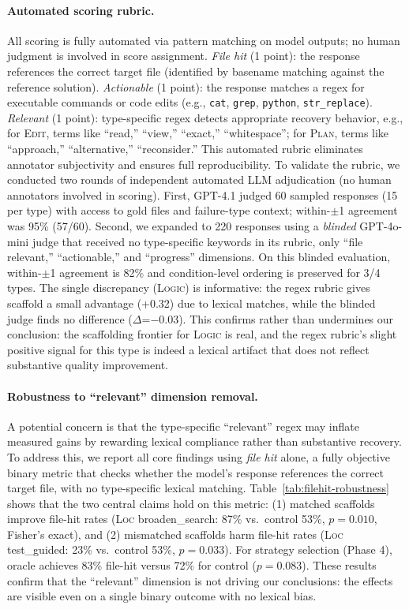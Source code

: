 \documentclass[11pt]{article}
\begin{document}
\paragraph{Automated scoring rubric.}
All scoring is fully automated via pattern matching on model outputs; no human judgment is involved in score assignment.
\textit{File hit} (1 point): the response references the correct target file (identified by basename matching against the reference solution).
\textit{Actionable} (1 point): the response matches a regex for executable commands or code edits (e.g., \texttt{cat}, \texttt{grep}, \texttt{python}, \texttt{str\_replace}).
\textit{Relevant} (1 point): type-specific regex detects appropriate recovery behavior, e.g., for \textsc{Edit}, terms like ``read,'' ``view,'' ``exact,'' ``whitespace''; for \textsc{Plan}, terms like ``approach,'' ``alternative,'' ``reconsider.''
This automated rubric eliminates annotator subjectivity and ensures full reproducibility.
To validate the rubric, we conducted two rounds of independent automated LLM adjudication (no human annotators involved in scoring).
First, GPT-4.1 judged 60 sampled responses (15 per type) with access to gold files and failure-type context; within-$\pm$1 agreement was 95\% (57/60).
Second, we expanded to 220 responses using a \textit{blinded} GPT-4o-mini judge that received no type-specific keywords in its rubric, only ``file relevant,'' ``actionable,'' and ``progress'' dimensions.
On this blinded evaluation, within-$\pm$1 agreement is 82\% and condition-level ordering is preserved for 3/4 types.
The single discrepancy (\textsc{Logic}) is informative: the regex rubric gives scaffold a small advantage (+0.32) due to lexical matches, while the blinded judge finds no difference ($\Delta$=$-$0.03).
This confirms rather than undermines our conclusion: the scaffolding frontier for \textsc{Logic} is real, and the regex rubric's slight positive signal for this type is indeed a lexical artifact that does not reflect substantive quality improvement.

\paragraph{Robustness to ``relevant'' dimension removal.}
A potential concern is that the type-specific ``relevant'' regex may inflate measured gains by rewarding lexical compliance rather than substantive recovery.
To address this, we report all core findings using \textit{file hit} alone, a fully objective binary metric that checks whether the model's response references the correct target file, with no type-specific lexical matching.
Table~\ref{tab:filehit-robustness} shows that the two central claims hold on this metric:
(1) matched scaffolds improve file-hit rates (\textsc{Loc} broaden\_search: 87\% vs.\ control 53\%, $p=0.010$, Fisher's exact), and
(2) mismatched scaffolds harm file-hit rates (\textsc{Loc} test\_guided: 23\% vs.\ control 53\%, $p=0.033$).
For strategy selection (Phase 4), oracle achieves 83\% file-hit versus 72\% for control ($p=0.083$).
These results confirm that the ``relevant'' dimension is not driving our conclusions: the effects are visible even on a single binary outcome with no lexical bias.
\end{document}
